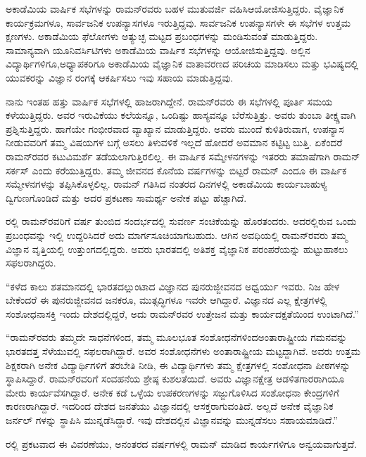 ಅಕಾಡೆಮಿಯ ವಾರ್ಷಿಕ ಸಭೆಗಳನ್ನು ರಾಮನ್‍ರವರು ಬಹಳ ಮುತುವರ್ಜಿ ವಹಿಸಿ\break ಆಯೋಜಿಸುತ್ತಿದ್ದರು. ವೈಜ್ಞಾನಿಕ ಕಾರ್ಯಕ್ರಮಗಳೂ, ಸಾರ್ವಜನಿಕ ಉಪನ್ಯಾಸಗಳೂ ಇರುತ್ತಿದ್ದವು. ಸಾರ್ವಜನಿಕ ಉಪನ್ಯಾಸಗಳೇ ಈ ಸಭೆಗಳ ಉತ್ತಮ ಕ್ಷಣಗಳು. ಅಕಾಡೆಮಿಯ ಫೆಲೋಗಳು ಅತ್ಯುಚ್ಛ ಮಟ್ಟದ ಪ್ರಬಂಧಗಳನ್ನು ಮಂಡಿಸುವಂತೆ ಮಾಡುತ್ತಿದ್ದರು. ಸಾಮಾನ್ಯವಾಗಿ ಯೂನಿವರ್ಸಿಟಿಗಳು ಅಕಾಡೆಮಿಯ ವಾರ್ಷಿಕ ಸಭೆಗಳನ್ನು ಆಯೋಜಿಸುತ್ತಿದ್ದವು. ಅಲ್ಲಿನ ವಿದ್ಯಾರ್ಥಿಗಳಿಗೂ,\break ಅಧ್ಯಾಪಕರಿಗೂ ಅಕಾಡೆಮಿಯ ವೈಜ್ಞಾನಿಕ ವಾತಾವರಣದ ಪರಿಚಯ ಮಾಡಿಸಲು ಮತ್ತು ಭವಿಷ್ಯದಲ್ಲಿ ಯುವಕರನ್ನು ವಿಜ್ಞಾನ ರಂಗಕ್ಕೆ ಆಕರ್ಷಿಸಲು ಇವು ಸಹಾಯ ಮಾಡುತ್ತಿದ್ದವು.

ನಾನು ಇಂತಹ ಹತ್ತು ವಾರ್ಷಿಕ ಸಭೆಗಳಲ್ಲಿ ಹಾಜರಾಗಿದ್ದೇನೆ. ರಾಮನ್‍ರವರು ಈ ಸಭೆಗಳಲ್ಲಿ ಪೂರ್ತಿ ಸಮಯ ಕಳೆಯುತ್ತಿದ್ದರು. ಅವರ ಇರುವಿಕೆಯು ಕಲೆಯನ್ನೂ, ಒಂದಿಷ್ಟು ಹಾಸ್ಯವನ್ನೂ ಬೆರೆಸುತ್ತಿತ್ತು. ಅವರು ತುಂಬಾ ತೀಕ್ಷ್ಣವಾಗಿ ಪ್ರಶ್ನಿಸುತ್ತಿದ್ದರು. ಹಾಗೆಯೇ ಗಂಭೀರವಾದ ವ್ಯಾಖ್ಯಾನ ಮಾಡುತ್ತಿದ್ದರು. ಅವರು ಮುಂದೆ ಕುಳಿತಿರುವಾಗ, ಉಪನ್ಯಾಸ ನೀಡುವವರಿಗೆ ತಮ್ಮ ವಿಷಯಗಳ ಬಗ್ಗೆ ಅಸಲು ತಿಳುವಳಿಕೆ ಇಲ್ಲದೆ ಹೋದರೆ ಅವಮಾನ ಕಟ್ಟಿಟ್ಟ ಬುತ್ತಿ. ಏಕೆಂದರೆ ರಾಮನ್‍ರವರ ಕಟುವಿಮರ್ಶೆ ತಡೆಯಲಾಗುತ್ತಿರಲಿಲ್ಲ. ಈ ವಾರ್ಷಿಕ ಸಮ್ಮೇಳನಗಳನ್ನು ಇತರರು ತಮಾಷೆಗಾಗಿ ರಾಮನ್‌ ಸರ್ಕಸ್ ಎಂದು ಕರೆಯುತ್ತಿದ್ದರು. ತಮ್ಮ ಜೀವನದ ಕೊನೆಯ ವರ್ಷಗಳನ್ನು ಬಿಟ್ಟರೆ ರಾಮನ್ ಎಂದೂ ಈ ವಾರ್ಷಿಕ ಸಮ್ಮೇಳನಗಳನ್ನು ತಪ್ಪಿಸಿಕೊಳ್ಳಲಿಲ್ಲ. ರಾಮನ್ ಗತಿಸಿದ ನಂತರದ ದಿನಗಳಲ್ಲಿ ಅಕಾಡೆಮಿಯ ಕಾರ್ಯಬಾಹುಳ್ಯ ದ್ವಿಗುಣಗೊಂಡಿದೆ ಮತ್ತು ಅದರ ಪ್ರಕಟಣಾ ಸಾಮರ್ಥ್ಯ ಅನೇಕ ಪಟ್ಟು ಹೆಚ್ಚಾಗಿದೆ.

ರಲ್ಲಿ ರಾಮನ್‍ರವರಿಗೆ  ವರ್ಷ ತುಂಬಿದ ಸಂದರ್ಭದಲ್ಲಿ ಸುವರ್ಣ ಸಂಚಿಕೆಯನ್ನು ಹೊರತಂದರು. ಅದರಲ್ಲಿರುವ ಒಂದು ಪ್ರಬಂಧವನ್ನು ಇಲ್ಲಿ ಉದ್ದರಿಸಿದರೆ ಅದು ಮಾರ್ಗಸೂಚಿ\-ಯಾಗಬಹುದು. ಆಗಿನ ಅವಧಿಯಲ್ಲಿ ರಾಮನ್‍ರವರು ತಮ್ಮ ವಿಜ್ಞಾನ ವೃತ್ತಿಯಲ್ಲಿ ಉತ್ತುಂಗದಲ್ಲಿದ್ದರು. ಅವರು ಭಾರತದಲ್ಲಿ ಅತಿಶಕ್ತ ವೈಜ್ಞಾನಿಕ ಪರಂಪರೆಯನ್ನು ಹುಟ್ಟುಹಾಕಲು ಸಫಲರಾಗಿದ್ದರು.

\enginline{--}“ಕಳೆದ ಕಾಲು ಶತಮಾನದಲ್ಲಿ ಭಾರತದಲ್ಲುಂಟಾದ ವಿಜ್ಞಾನದ ಪುನರುಜ್ಜೀವನದ ಅಧ್ವರ್ಯು ಇವರು. ನಿಜ ಹೇಳ ಬೇಕೆಂದರೆ ಈ ಪುನರುಜ್ಜೀವನದ ಜನಕರೂ, ಮುತ್ಸದ್ಧಿಗಳೂ ಇವರೇ ಆಗಿದ್ದಾರೆ. ವಿಜ್ಞಾನದ ಎಲ್ಲ ಕ್ಷೇತ್ರಗಳಲ್ಲಿ ಸಂಶೋಧನಾಸಕ್ತಿ ಇಂದು ದೇಶದಲ್ಲಿದ್ದರೆ, ಅದು ರಾಮನ್‍ರವರ ಉತ್ತೇಜನ ಮತ್ತು ಕಾರ್ಯದಕ್ಷತೆಯಿಂದ ಉಂಟಾಗಿದೆ.”

“ರಾಮನ್‍ರವರು ತಮ್ಮದೇ ಸಾಧನೆಗಳಿಂದ, ತಮ್ಮ ಮೂಲಭೂತ ಸಂಶೋಧನೆಗಳಿಂದ\break ಅಂತಾರಾಷ್ಟ್ರೀಯ ಗಮನವನ್ನು ಭಾರತದತ್ತ ಸೆಳೆಯುವಲ್ಲಿ ಸಫಲರಾಗಿದ್ದಾರೆ. ಅವರ ಸಂಶೋಧನೆಗಳು ಅಂತಾರಾಷ್ಟ್ರೀಯ ಮಟ್ಟದ್ದಾಗಿವೆ. ಅವರು ಉತ್ತಮ ಶಿಕ್ಷಕರಾಗಿ ಅನೇಕ ವಿದ್ಯಾರ್ಥಿಗಳಿಗೆ ತರಬೇತಿ ನೀಡಿ, ಈ ವಿದ್ಯಾರ್ಥಿಗಳು ತಮ್ಮ ಕ್ಷೇತ್ರಗಳಲ್ಲಿ ಸಂಶೋಧನಾ ಪೀಠಗಳನ್ನು ಸ್ಥಾಪಿಸಿದ್ದಾರೆ. ರಾಮನ್\-‍ರವರಿಗೆ ಸಂವಹನೆಯ ಶ್ರೇಷ್ಠ ಕುಶಲತೆಯಿದೆ. ಅವರು ವಿಜ್ಞಾನಕ್ಷೇತ್ರ ಆಡಳಿತಗಾರರಾಗಿಯೂ ಮೇರು ಕಾರ್ಯವೆಸಗಿದ್ದಾರೆ. ಅನೇಕ ಕಡೆ ಒಳ್ಳೆಯ ಉಪಕರಣಗಳನ್ನು ಸಜ್ಜುಗೊಳಿಸಿದ ಸಂಶೋಧನಾ ಕೇಂದ್ರಗಳಿಗೆ ಕಾರಣರಾಗಿದ್ದಾರೆ. ಇದರಿಂದ ದೇಶದ ಜನತೆಯು ವಿಜ್ಞಾನದಲ್ಲಿ ಆಸಕ್ತರಾಗುವಂತಿದೆ. ಅಲ್ಲದೆ ಅನೇಕ ವೈಜ್ಞಾನಿಕ ಜರ್ನಲ್ ಗಳನ್ನು ಸ್ಥಾಪಿಸಿ ಮುನ್ನಡೆಸಿದ್ದಾರೆ. ಇವು ದೇಶದಲ್ಲಿನ ವಿಜ್ಞಾನವನ್ನು ಮುನ್ನಡೆಸಲು ಸಹಾಯಮಾಡಿದೆ.”

ರಲ್ಲಿ ಪ್ರಕಟವಾದ ಈ ವಿವರಣೆಯು, ಅನಂತರದ ವರ್ಷಗಳಲ್ಲಿ ರಾಮನ್ ಮಾಡಿದ ಕಾರ್ಯಗಳಿಗೂ ಅನ್ವಯವಾಗುತ್ತದೆ.

